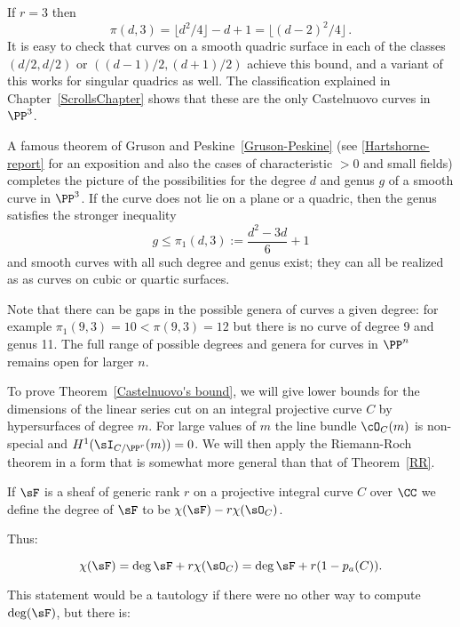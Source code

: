 \begin{example}If $r=3$ then
$$
\pi(d,3) = \lfloor d^2/4 \rfloor-d+1 = \lfloor (d-2)^2/4\rfloor\, .
$$
It is easy to check that curves on a smooth quadric surface in each of the classes
$(d/2, d/2)$ or $((d-1)/2, (d+1)/2)$
achieve this bound, and a variant of this works for singular quadrics as well. The classification  explained in Chapter~\ref{ScrollsChapter}
shows that these are the only Castelnuovo curves in $\PP^3$.
\end{example}

\begin{fact}
A famous theorem of Gruson and Peskine~\ref{Gruson-Peskine} (see \ref{Hartshorne-report} for an exposition and also the cases of characteristic $>0$ and small fields) completes the picture of the possibilities for the degree $d$ and  genus $g$  of a smooth curve in $\PP^3$. If the curve does not lie on a plane or a quadric, then the genus satisfies the stronger inequality
$$
g\leq \pi_1(d,3) := \frac{d^2-3d}{6} +1
$$
and smooth curves with all such degree and genus exist; they can all be realized as as curves
on cubic or quartic surfaces.

Note that there can be gaps in the possible genera of curves a given degree: for example  $\pi_1(9,3) = 10<\pi(9,3) =12$ but there is
no curve of degree 9 and genus 11. 
The full range of possible degrees and genera for curves in $\PP^n$ remains open for larger $n$. 
\end{fact}

To prove Theorem~\ref{Castelnuovo's bound}, we will give lower bounds for the dimensions of the linear series  cut on an integral projective curve $C$ by hypersurfaces of degree $m$. For large values of $m$ the line bundle $\cO_C(m)$ is non-special and $H^1(\sI_{C/\PP^r}(m)) = 0$. We will then apply the Riemann-Roch theorem in a form that is somewhat more general
than that of Theorem~\ref{RR}. 
\begin{definition}
 If $\sF$ is a sheaf of generic rank $r$ on a projective integral curve $C$ over $\CC$ we define the degree
 of $\sF$ to be $\chi(\sF) -r\chi(\sO_C)$.
\end{definition}

Thus:
\begin{theorem}\label{general RR without duality}
$$
 \chi(\sF) = \deg \sF + r\chi(\sO_C) = \deg \sF + r(1-p_a(C)).
 $$
\end{theorem}
 
This statement would be
a tautology if there were no other way to compute $\deg(\sF)$, but there is:

